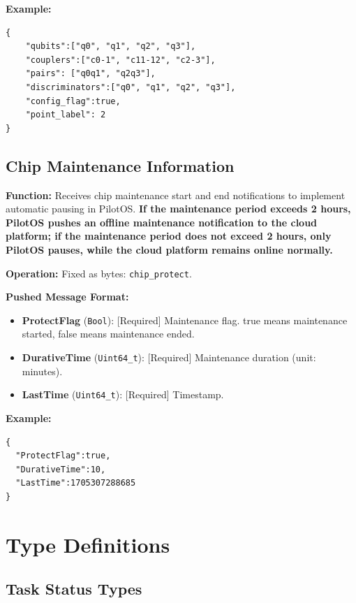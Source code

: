 \documentclass[12pt, a4paper]{article}
\begin{document}
\noindent \textbf{Example:}
\begin{lstlisting}
{
    "qubits":["q0", "q1", "q2", "q3"],
    "couplers":["c0-1", "c11-12", "c2-3"],
    "pairs": ["q0q1", "q2q3"],
    "discriminators":["q0", "q1", "q2", "q3"],
    "config_flag":true,
    "point_label": 2
}
\end{lstlisting}

\subsection{Chip Maintenance Information}

\textbf{Function:} Receives chip maintenance start and end notifications to implement automatic pausing in PilotOS. \textbf{If the maintenance period exceeds 2 hours, PilotOS pushes an offline maintenance notification to the cloud platform; if the maintenance period does not exceed 2 hours, only PilotOS pauses, while the cloud platform remains online normally.}

\textbf{Operation:} Fixed as bytes: \texttt{chip\_protect}.

\textbf{Pushed Message Format:}
\begin{itemize}
    \item \textbf{ProtectFlag} (\texttt{Bool}): [Required] Maintenance flag. true means maintenance started, false means maintenance ended.
    \item \textbf{DurativeTime} (\texttt{Uint64\_t}): [Required] Maintenance duration (unit: minutes).
    \item \textbf{LastTime} (\texttt{Uint64\_t}): [Required] Timestamp.
\end{itemize}

\noindent \textbf{Example:}
\begin{lstlisting}
{
  "ProtectFlag":true,
  "DurativeTime":10,
  "LastTime":1705307288685
}
\end{lstlisting}

\section{Type Definitions}

\subsection{Task Status Types}
\end{document}
